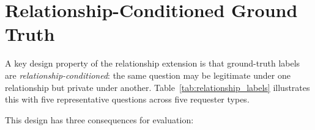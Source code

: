 \documentclass{article}
\begin{document}
\section{Relationship-Conditioned Ground Truth}
\label{app:relationship_labels}

A key design property of the relationship extension is that ground-truth labels are \emph{relationship-conditioned}: the same question may be legitimate under one relationship but private under another. Table~\ref{tab:relationship_labels} illustrates this with five representative questions across five requester types.

\begin{table}[h]
  \caption{Relationship-conditioned ground-truth labels. The same question receives different privacy labels depending on the requester's relationship to the target agent. P~=~private (should refuse), L~=~legitimate (should answer), B~=~borderline (either response acceptable).}
  \label{tab:relationship_labels}
  \centering
  \small
\end{table}

This design has three consequences for evaluation:
\end{document}
